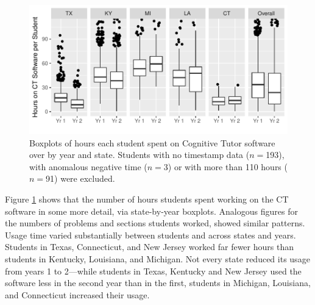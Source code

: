 \documentclass[12pt]{article}\usepackage[]{graphicx}\usepackage[]{color}
\makeatletter
\def\maxwidth{ %
  \ifdim\Gin@nat@width>\linewidth
    \linewidth
  \else
    \Gin@nat@width
  \fi
}
\makeatother
\begin{document}
\begin{figure}
\centering

\includegraphics[width=\maxwidth]{figure/usageTime-1} 

\caption{Boxplots of hours each student spent on Cognitive Tutor
  software over by year and state. Students  with no timestamp data
  ($n=$193), with anomalous negative time
  ($n=$3) or with more than 110 hours ($n=$91)
  were excluded.}
\label{fig:timeByStud}
\end{figure}






Figure \ref{fig:timeByStud} shows that the number of hours students
spent working on the CT software in some more detail, via
state-by-year boxplots.
Analogous figures for the numbers of problems and sections students
worked, %
showed similar patterns.%
Usage time varied substantially between students and across states and
years.
Students in Texas,
Connecticut, and New Jersey worked far fewer hours than students in
Kentucky, Louisiana, and Michigan.
Not every state reduced its usage from years 1 to 2---while students
in Texas, Kentucky and New Jersey used the software less in the second
year than in the first, students in Michigan, Louisiana, and
Connecticut increased their usage.
\end{document}
